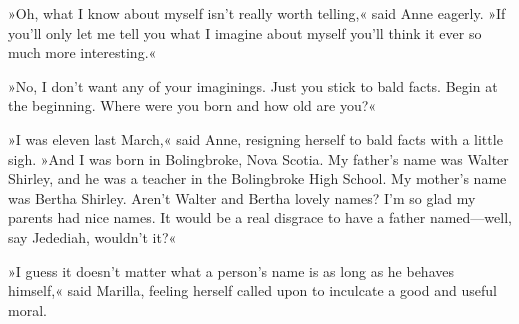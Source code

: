 »Oh, what I know about myself isn't really worth telling,« said Anne eagerly. »If you'll only let me tell you what I imagine about myself you'll think it ever so much more interesting.«

»No, I don't want any of your imaginings. Just you stick to bald facts. Begin at the beginning. Where were you born and how old are you?«

»I was eleven last March,« said Anne, resigning herself to bald facts with a little sigh. »And I was born in Bolingbroke, Nova Scotia. My father's name was Walter Shirley, and he was a teacher in the Bolingbroke High School. My mother's name was Bertha Shirley. Aren't Walter and Bertha lovely names? I'm so glad my parents had nice names. It would be a real disgrace to have a father named—well, say Jedediah, wouldn't it?«

»I guess it doesn't matter what a person's name is as long as he behaves himself,« said Marilla, feeling herself called upon to inculcate a good and useful moral.


